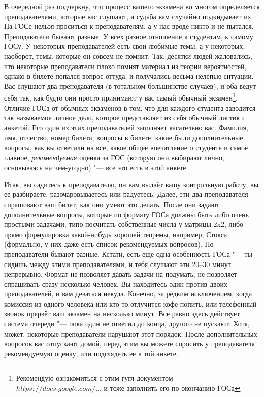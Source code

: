 В очередной раз подчеркну, что процесс вашего экзамена во многом определяется преподавателями, которые вас слушают, а судьба вам случайно подкидывает их. На ГОСе нельзя проситься к преподавателям, а у нас вроде никто и не пытался. Преподаватели бывают разные. У всех разное отношение к студентам, к самому ГОСу. У некоторых преподавателей есть свои любимые темы, а у некоторых, наоборот, темы, которые он совсем не помнит. Так, десятки людей жаловались, что некоторые преподаватели плохо помнят материал из теории вероятностей, однако в билете попался вопрос оттуда, и получались весьма нелепые ситуации. Вас слушают два преподавателя (в тотальном большинстве случаев), и оба ведут себя так, как будто они просто принимают у вас самый обычный экзамен\footnote{Рекомендую ознакомиться с этим гугл-документом \href{https://docs.google.com/spreadsheets/d/10jIg9Nr5oM1-Zjo_iIlKs8uxrBKrzfuJNas_YJIIxPs/edit\#gid=0}{$https://docs.google.com/...$} и тоже заполнить его по окончанию ГОСа}. Отличие ГОСа от обычных экзаменов в том, что для каждого студента заводится так называемое личное дело, которое представляет из себя обычный листик с анкетой. Его один из этих преподавателей заполняет касательно вас. Фамилия, имя, отчество, номер билета, вопросы в билете, какие были дополнительные вопросы, как вы ответили на все, какое общее впечатление о студенте и самое главное, \textit{рекомендуемая} оценка за ГОС (которую они выбирают лично, основываясь на чем-угодно) "--- все это есть в этой анкете. 

Итак, вы садитесь к преподавателю, он вам выдаёт вашу контрольную работу, вы ее разбираете, разочаровываетесь или радуетесь. Далее, эти два преподавателя спрашивают ваш билет, как они умеют это делать. После они задают дополнительные вопросы, которые по формату ГОСа должны быть либо очень простыми задачами, типо посчитать собственные числа у матрицы 2x2, либо прямо формулировка какой-нибудь хорошей теоремы, например, Стокса (формально, у них даже есть список рекомендуемых вопросов). Но преподаватели бывают разные. Кстати, есть ещё одна особенность ГОСа "--- ты сидишь между этими преподавателями, и тебя слушают эти 20--30 минут непрерывно. Формат не позволяет давать задачи на подумать, не позволяет спрашивать сразу несколько человек. Вы находитесь один против двоих преподавателей, и вам деваться некуда. Конечно, за редким исключением, когда комиссия из одного человека или кто-то отлучится кофе попить, или телефонный звонок прервёт ваш экзамен на несколько минут. Все равно здесь действует система очереди "--- пока один не ответил до конца, другого не пускают. Хотя, может, некоторые преподаватели нарушают этот порядок. После дополнительных вопросов вас отпускают домой, перед этим вы можете спросить у преподавателя рекомендуемую оценку, или подглядеть ее в той анкете.

